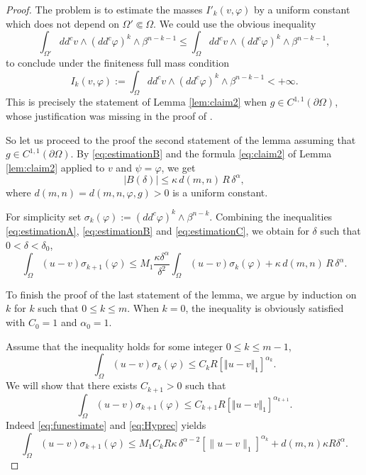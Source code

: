 \begin{proof}
The problem is to estimate the masses $I'_k (v,\varphi) $ by a uniform constant which does not depend on $\Omega' \Subset \Omega$.
We could use the obvious inequality
\[
\int_{\Omega'} dd^c v \wedge(dd^c\varphi)^k\wedge\beta^{n-k-1} \leq \int_{\Omega} dd^c v \wedge(dd^c\varphi)^k\wedge\beta^{n-k-1},
\]
to conclude under the finiteness full mass condition
\[ I_k (v,\varphi) := \int_{\Omega} dd^c v \wedge(dd^c\varphi)^k\wedge\beta^{n-k-1}< + \infty.\]
This is precisely the statement of Lemma \ref{lem:claim2} when $g \in C^{1,1} (\partial \Omega)$, whose justification was missing in the proof of \cite[Lem.\,4.2]{BZ20}.

So let us proceed to the proof the second statement of the lemma assuming that $g \in C^{1,1} (\partial \Omega)$.
By \eqref{eq:estimationB} and the formula \eqref{eq:claim2} of Lemma \ref{lem:claim2} applied to $v$ and $\psi = \varphi$, we get
\begin{equation} \label{eq:estimationC}
|B (\delta)| \leq \kappa \, d(m,n) \, R \, \delta^{\alpha},
\end{equation}
where $d(m,n) = d(m,n,\varphi,g) >0$ is a uniform constant.

For simplicity set $ \sigma_{k }(\varphi) := (dd^c \varphi)^k \wedge \beta^{n - k}.$ Combining the inequalities \eqref{eq:estimationA}, \eqref{eq:estimationB} and \eqref{eq:estimationC}, we obtain for $\delta$ such that $0 < \delta < \delta_0$,
\begin{equation} \label{eq:funestimate}
\int_{\Omega}(u-v) \sigma_{k +1}(\varphi)\leq M_1 \frac{\kappa \delta^\alpha}{\delta^2} \int_{\Omega} (u-v) \sigma_{k }(\varphi) + \kappa \, d(m,n) \, R \, \delta^{\alpha}.
\end{equation}

To finish the proof of the last statement of the lemma, we argue by induction on~$k$ for $k$ such that $0 \leq k \leq m$.
When $k=0$, the inequality is obviously satisfied with $C_0 = 1$ and $\alpha_0 = 1$.

Assume that the inequality holds for some integer $0 \leq k\leq m - 1$, \ie
\begin{equation}\label{eq:Hyprec}
\int_{\Omega}( u-v) \sigma_k{(\varphi)}\leq C_{k} R[\Vert u-v \Vert_1]^{\alpha_k}.
\end{equation}
We will show that there exists $C_{k+1} > 0$ such that
\[
\int_{\Omega}(u-v) \sigma_{k+1}(\varphi)\leq C_{k+1} R[\Vert u-v \Vert_1]^{\alpha_{k+1}}.
\]
Indeed \eqref{eq:funestimate} and \eqref{eq:Hyprec} yields
\[
\int_{\Omega}(u-v) \sigma_{k+1}(\varphi)\leq
M_1 C_k R \kappa \, \delta^{\alpha - 2} [\|u-v\|_1]^{\alpha_k} + d(m,n) \kappa R \delta^{\alpha}.
\]


\end{proof}
